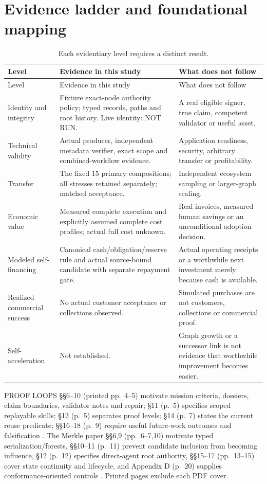 \documentclass[11pt,a4paper]{article}
\begin{document}
\clearpage
\appendix
\small
\section{Evidence ladder and foundational mapping}
\label{app:ladder}
\begin{longtable}{L{31mm}L{51mm}L{67mm}}
\caption{Each evidentiary level requires a distinct result.}\\
\toprule Level & Evidence in this study & What does not follow \\
\midrule\endfirsthead
\toprule Level & Evidence in this study & What does not follow \\
\midrule\endhead
Identity and integrity & Fixture exact-node authority policy; typed records, paths and root history. Live identity: NOT RUN. & A real eligible signer, true claim, competent validator or useful asset. \\
Technical validity & Actual producer, independent metadata verifier, exact scope and combined-workflow evidence. & Application readiness, security, arbitrary transfer or profitability. \\
Transfer & The fixed 15 primary compositions; all stresses retained separately; matched acceptance. & Independent ecosystem sampling or larger-graph scaling. \\
Economic value & Measured complete execution and explicitly assumed complete cost profiles; actual full cost unknown. & Real invoices, measured human savings or an unconditional adoption decision. \\
Modeled self-financing & Canonical cash/obligation/reserve rule and actual source-bound candidate with separate repayment gate. & Actual operating receipts or a worthwhile next investment merely because cash is available. \\
Realized commercial success & No actual customer acceptance or collections observed. & Simulated purchases are not customers, collections or commercial proof. \\
Self-acceleration & Not established. & Graph growth or a successor link is not evidence that worthwhile improvement becomes easier. \\
\bottomrule
\end{longtable}

PROOF LOOPS §§6--10 (printed pp.~4--5) motivate mission criteria, dossiers, claim boundaries, validator notes and repair; §11 (p.~5) specifies scoped replayable skills; §12 (p.~5) separates proof levels; §14 (p.~7) states the current reuse predicate; §§16--18 (p.~9) require useful future-work outcomes and falsification \citep{proofloops}. The Merkle paper §§6,9 (pp.~6--7,10) motivate typed serialization/forests, §§10--11 (p.~11) prevent candidate inclusion from becoming influence, §12 (p.~12) specifies direct-agent root authority, §§15--17 (pp.~13--15) cover state continuity and lifecycle, and Appendix D (p.~20) supplies conformance-oriented controls \citep{merkle}. Printed pages exclude each PDF cover.
\end{document}
